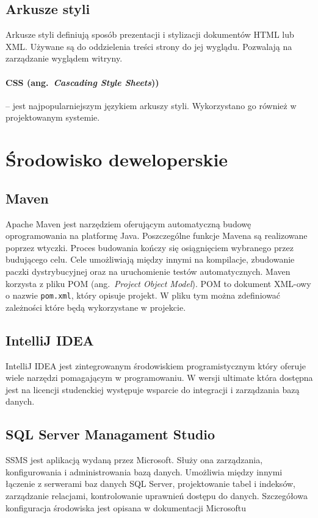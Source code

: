 \subsection{Arkusze styli}
Arkusze styli definiują sposób prezentacji i stylizacji dokumentów HTML lub XML. Używane są do oddzielenia treści strony do jej wyglądu. Pozwalają na zarządzanie wyglądem witryny. 
\paragraph{CSS (ang.~\emph{Cascading Style Sheets}))} -- jest najpopularniejszym językiem arkuszy styli. Wykorzystano go również w projektowanym systemie.

\section{Środowisko deweloperskie}
\subsection{Maven}
Apache Maven jest narzędziem oferującym automatyczną budowę oprogramowania na platformę Java. Poszczególne funkcje Mavena są realizowane poprzez wtyczki. Proces budowania kończy się osiągnięciem wybranego przez budującego celu. Cele umożliwiają między innymi na kompilacje, zbudowanie paczki dystrybucyjnej oraz na uruchomienie testów automatycznych. Maven korzysta z pliku POM (ang.~\emph{Project Object Model}). POM to dokument XML-owy o nazwie \texttt{pom.xml}, który opisuje projekt. W pliku tym można zdefiniować zależności które będą wykorzystane w projekcie. 

\subsection{IntelliJ IDEA} %
IntelliJ IDEA jest zintegrowanym środowiskiem programistycznym który oferuje wiele narzędzi pomagającym w programowaniu. W wersji ultimate która dostępna jest na licencji studenckiej występuje wsparcie do integracji i zarządzania bazą danych.

\subsection{SQL Server Managament Studio}
\label{ssms:label}
SSMS jest aplikacją wydaną przez Microsoft. Służy ona zarządzania, konfigurowania i administrowania bazą danych. Umożliwia między innymi łączenie z serwerami baz danych SQL Server, projektowanie tabel i indeksów, zarządzanie relacjami, kontrolowanie uprawnień dostępu do danych. Szczegółowa konfiguracja środowiska jest opisana w dokumentacji Microsoftu \cite{ssms}

